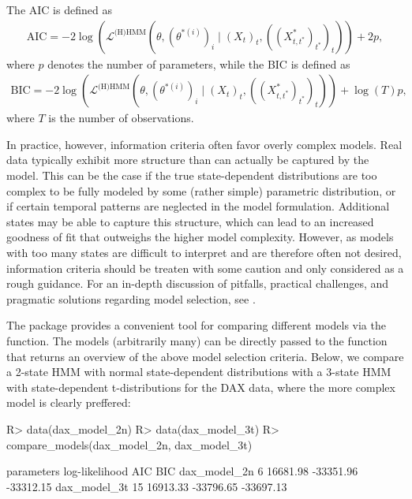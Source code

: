 \documentclass[article]{jss}
\newcommand{\fct}[1]{\code{#1()}}
\begin{document}
The AIC is defined as
\begin{align*}
\text{AIC} = - 2 \log (\mathcal{L}^\text{(H)HMM}(\theta,(\theta^{*(i)})_i\mid (X_t)_t,((X^*_{t,t^*})_{t^*})_t)) + 2 p,
\end{align*}
where $p$ denotes the number of parameters, while the BIC is defined as
\begin{align*}
\text{BIC} = - 2 \log (\mathcal{L}^\text{(H)HMM}(\theta,(\theta^{*(i)})_i\mid (X_t)_t,((X^*_{t,t^*})_{t^*})_t)) + \log(T) p,
\end{align*}
where $T$ is the number of observations.

In practice, however, information criteria often favor overly complex models. Real data typically exhibit more structure than can actually be captured by the model. This can be the case if the true state-dependent distributions are too complex to be fully modeled by some (rather simple) parametric distribution, or if certain temporal patterns are neglected in the model formulation. Additional states may be able to capture this structure, which can lead to an increased goodness of fit that outweighs the higher model complexity. However, as models with too many states are difficult to interpret and are therefore often not desired, information criteria should be treaten with some caution and only considered as a rough guidance. For an in-depth discussion of pitfalls, practical challenges, and pragmatic solutions regarding model selection, see \cite{poh17}.

The  package provides a convenient tool for comparing different models via the \fct{compare\_models} function. The models (arbitrarily many) can be directly passed to the \fct{compare\_models} function that returns an overview of the above model selection criteria. Below, we compare a 2-state HMM with normal state-dependent distributions with a 3-state HMM with state-dependent t-distributions for the DAX data, where the more complex model is clearly preffered:

%
\begin{Schunk}
\begin{Sinput}
R> data(dax_model_2n)
R> data(dax_model_3t)
R> compare_models(dax_model_2n, dax_model_3t)
\end{Sinput}
\begin{Soutput}
             parameters log-likelihood       AIC       BIC
dax_model_2n          6       16681.98 -33351.96 -33312.15
dax_model_3t         15       16913.33 -33796.65 -33697.13
\end{Soutput}
\end{Schunk}
%
\end{document}

